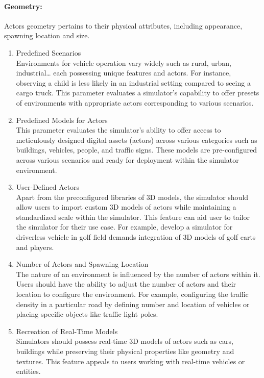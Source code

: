 \documentclass[12pt,twoside,a4paper,parskip]{scrbook} %
\begin{document}
\paragraph*{Geometry:}
Actors geometry pertains to their physical attributes, including appearance, spawning location and size.
\begin{enumerate}[label=\alph*.]
    \item Predefined Scenarios\\
    Environments for vehicle operation vary widely such as rural, urban, industrial… each possessing unique features and actors. For instance, observing a child is less likely in an industrial setting compared to seeing a cargo truck. This parameter evaluates a simulator's capability to offer presets of environments with appropriate actors corresponding to various scenarios.
    
    \item Predefined Models for Actors\\
    This parameter evaluates the simulator's ability to offer access to meticulously designed digital assets (actors) across various categories such as buildings, vehicles, people, and traffic signs. These models are pre-configured across various scenarios and ready for deployment within the simulator environment.
    
    \item User-Defined Actors\\
    Apart from the preconfigured libraries of 3D models, the simulator should allow users to import custom 3D models of actors while maintaining a standardized scale within the simulator. This feature can aid user to tailor the simulator for their use case. For example, develop a simulator for driverless vehicle in golf field demands integration of 3D models of golf carts and players.
    
    \item Number of Actors and Spawning Location\\
    The nature of an environment is influenced by the number of actors within it. Users should have the ability to adjust the number of actors and their location to configure the environment. For example, configuring the traffic density in a particular road by defining number and location of vehicles or placing specific objects like traffic light poles.
    
    \item Recreation of Real-Time Models\\
    Simulators should possess real-time 3D models of actors such as cars, buildings while preserving their physical properties like geometry and textures. This feature appeals to users working with real-time vehicles or entities.
    

\end{enumerate}
\end{document}
